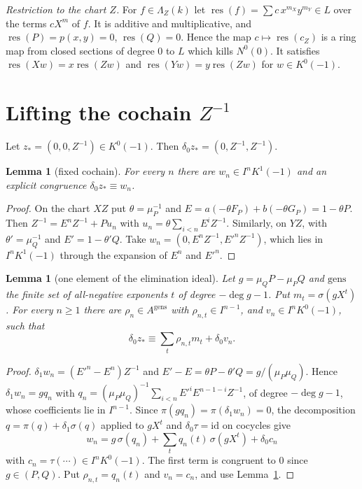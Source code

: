 \documentclass[11pt]{amsart}
\newtheorem{lemma}[theorem]{Lemma}
\theoremstyle{definition}
\theoremstyle{remark}
\DeclareMathOperator{\res}{res}
\newcommand{\La}{\Lambda}
\begin{document}
\emph{Restriction to the chart $Z$.} For $f\in\La_Z(k)$ let
$\res(f)=\sum c\,x^{m_X}y^{m_Y}\in L$ over the terms $cX^m$ of $f$. It is
additive and multiplicative, and $\res(P)=p(x,y)=0$, $\res(Q)=0$. Hence the
map $c\mapsto\res(c_Z)$ is a ring map from closed sections of degree $0$ to
$L$ which kills $N^0(0)$. It satisfies
$\res(Xw)=x\res(Zw)$ and $\res(Yw)=y\res(Zw)$ for $w\in K^0(-1)$.

\section{Lifting the cochain \texorpdfstring{$Z^{-1}$}{1/Z}}\label{sec:lift}

Let $z_*=(0,0,Z^{-1})\in K^0(-1)$. Then $\delta_0z_*=(0,Z^{-1},Z^{-1})$.

\begin{lemma}[fixed cochain]\label{lem:fixed}
For every $n$ there are $w_n\in I^nK^1(-1)$ and an explicit congruence
$\delta_0z_*\equiv w_n$.
\end{lemma}
\begin{proof}
On the chart $XZ$ put $\theta=\mu_P^{-1}$ and $E=a(-\theta F_P)+b(-\theta
G_P)=1-\theta P$. Then $Z^{-1}=E^nZ^{-1}+Pu_n$ with
$u_n=\theta\sum_{i<n}E^iZ^{-1}$. Similarly, on $YZ$, with $\theta'=\mu_Q^{-1}$
and $E'=1-\theta'Q$. Take $w_n=(0,E^nZ^{-1},E'^nZ^{-1})$, which lies in
$I^nK^1(-1)$ through the expansion of $E^n$ and $E'^n$.
\end{proof}

\begin{lemma}[one element of the elimination ideal]\label{lem:F1}
Let $g=\mu_QP-\mu_PQ$ and $\mathrm{gens}$ the finite set of all-negative
exponents $t$ of degree $-\deg g-1$. Put $m_t=\sigma(gX^t)$. For every $n\ge1$
there are $\rho_n\in A^{\mathrm{gens}}$ with $\rho_{n,t}\in I^{n-1}$, and
$v_n\in I^nK^0(-1)$, such that
\[
 \delta_0z_*\equiv\sum_t\rho_{n,t}m_t+\delta_0v_n .
\]
\end{lemma}
\begin{proof}
$\delta_1w_n=(E'^n-E^n)Z^{-1}$ and $E'-E=\theta P-\theta'Q=g/(\mu_P\mu_Q)$.
Hence $\delta_1w_n=gq_n$ with
$q_n=(\mu_P\mu_Q)^{-1}\sum_{i<n}E'^iE^{n-1-i}Z^{-1}$, of degree $-\deg g-1$,
whose coefficients lie in $I^{n-1}$. Since $\pi(gq_n)=\pi(\delta_1w_n)=0$,
the decomposition $q=\pi(q)+\delta_1\sigma(q)$ applied to $gX^t$ and
$\delta_0\tau=\mathrm{id}$ on cocycles give
\[
 w_n=g\,\sigma(q_n)+\sum_tq_n(t)\,\sigma(gX^t)+\delta_0c_n
\]
with $c_n=\tau(\cdots)\in I^nK^0(-1)$. The first term is congruent to $0$
since $g\in(P,Q)$. Put $\rho_{n,t}=q_n(t)$ and $v_n=c_n$, and use
Lemma~\ref{lem:fixed}.
\end{proof}
\end{document}
